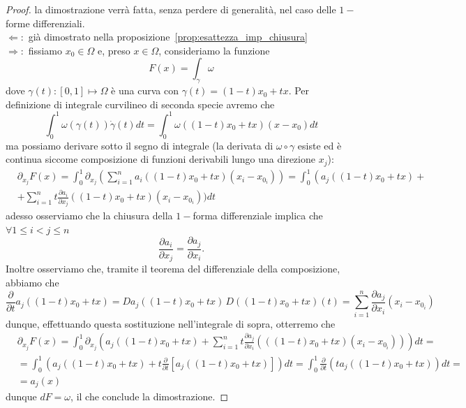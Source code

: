 \begin{proof} 
	la dimostrazione verrà fatta, senza perdere di generalità, nel caso delle $1-$forme differenziali. \\
	$\boxed{\Leftarrow}:$ già dimostrato nella proposizione~\ref{prop:esattezza_imp_chiusura} \\
	$\boxed{\Rightarrow}:$ %
	fissiamo $x_0 \in \Omega$ e, preso $x \in \Omega$, consideriamo la funzione
	$$
		F(x) = \int_\gamma \omega
	$$
	dove $\gamma(t) : [0, 1] \mapsto \Omega$ è una curva con $\gamma(t)=(1-t) x_0 + tx$. Per definizione di integrale curvilineo di seconda specie avremo che
	$$
		\int_0^1 \omega(\gamma(t)) \dot{\gamma}(t) dt = \int_0^1 \omega((1-t)x_0 + tx)(x-x_0)dt
	$$
	ma possiamo derivare sotto il segno di integrale (la derivata di $\omega \circ \gamma$ esiste ed è continua siccome composizione di funzioni derivabili lungo una direzione $x_j$):
	\begin{align*}
	&\partial_{x_j} F(x) = \int_0^1 \partial_{x_j} \left(\sum_{i=1}^n a_i((1-t)x_0 + tx)(x_i-x_{0_i}) \right) = \int_0^1 \left(a_j((1-t)x_0 + tx) + \right. \\
	&+\sum_{i=1}^n t\frac{\partial a_i}{\partial x_j}((1-t)x_0 + tx)(x_i - x_{0_i}) \Bigg) dt
	\end{align*}
	adesso osserviamo che la chiusura della $1-$forma differenziale implica che $\forall 1 \leq i < j \leq n$
	$$
	\frac{\partial a_i}{\partial x_j} = \frac{\partial a_j}{\partial x_i}.
	$$
	Inoltre osserviamo che, tramite il teorema del differenziale della composizione, abbiamo che 
	$$
		\frac{\partial}{\partial t} a_j((1-t)x_0 + tx) = Da_j((1-t)x_0 + tx) \, D((1-t)x_0 + tx)(t) = \sum_{i=1}^n \frac{\partial a_j}{\partial x_i}(x_i - x_{0_i})
	$$
	dunque, effettuando questa sostituzione nell'integrale di sopra, otterremo che
	\begin{align*}
	&\partial_{x_j} F(x) = \int_0^1 \partial_{x_j} \left(a_j((1-t)x_0 + tx) + \sum_{i=1}^n t\frac{\partial a_j}{\partial x_i} \left( ((1-t)x_0 + tx) (x_i - x_{0_i}) \right) \right) dt = \\
	&=\int_0^1 \left( a_j((1-t)x_0 + tx) + t\frac{\partial}{\partial t} \left[ a_j((1-t)x_0 + tx) \right] \right)dt = \int_0^1 \frac{\partial}{\partial t} \left( ta_j((1-t)x_0 + tx) \right)dt = \\
	&=a_j(x) 
	\end{align*}
	dunque $dF=\omega$, il che conclude la dimostrazione.
\end{proof}
